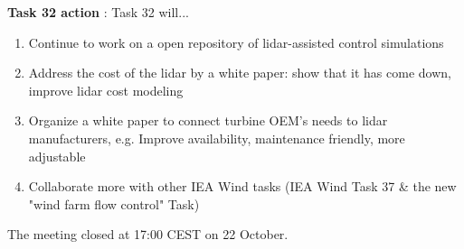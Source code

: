 \textbf{Task 32 action} : Task 32 will...

\begin{enumerate}
\item
  Continue to work on a open repository of lidar-assisted control
  simulations
\item
  Address the cost of the lidar by a white paper: show that it has come
  down, improve lidar cost modeling
\item
  Organize a white paper to connect turbine OEM's needs to lidar
  manufacturers, e.g. Improve availability, maintenance friendly, more
  adjustable
\item
  Collaborate more with other IEA Wind tasks (IEA Wind Task 37 & the new "wind farm flow control" Task)
\end{enumerate}

The meeting closed at 17:00 CEST on 22 October.